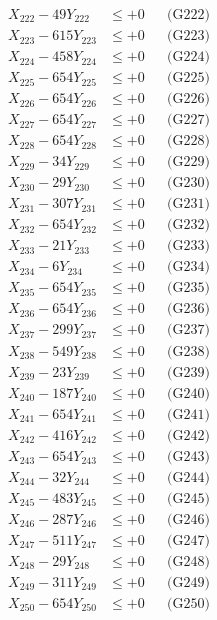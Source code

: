 \documentclass[a4paper,10pt]{article}
\begin{document}
{\begin{align}
X_{222} - 49Y_{222} &\leq +0 && \text{(G222)} \\
X_{223} - 615Y_{223} &\leq +0 && \text{(G223)} \\
X_{224} - 458Y_{224} &\leq +0 && \text{(G224)} \\
X_{225} - 654Y_{225} &\leq +0 && \text{(G225)} \\
X_{226} - 654Y_{226} &\leq +0 && \text{(G226)} \\
X_{227} - 654Y_{227} &\leq +0 && \text{(G227)} \\
X_{228} - 654Y_{228} &\leq +0 && \text{(G228)} \\
X_{229} - 34Y_{229} &\leq +0 && \text{(G229)} \\
X_{230} - 29Y_{230} &\leq +0 && \text{(G230)} \\
\allowbreak
X_{231} - 307Y_{231} &\leq +0 && \text{(G231)} \\
X_{232} - 654Y_{232} &\leq +0 && \text{(G232)} \\
X_{233} - 21Y_{233} &\leq +0 && \text{(G233)} \\
X_{234} - 6Y_{234} &\leq +0 && \text{(G234)} \\
X_{235} - 654Y_{235} &\leq +0 && \text{(G235)} \\
X_{236} - 654Y_{236} &\leq +0 && \text{(G236)} \\
X_{237} - 299Y_{237} &\leq +0 && \text{(G237)} \\
X_{238} - 549Y_{238} &\leq +0 && \text{(G238)} \\
X_{239} - 23Y_{239} &\leq +0 && \text{(G239)} \\
X_{240} - 187Y_{240} &\leq +0 && \text{(G240)} \\
\allowbreak
X_{241} - 654Y_{241} &\leq +0 && \text{(G241)} \\
X_{242} - 416Y_{242} &\leq +0 && \text{(G242)} \\
X_{243} - 654Y_{243} &\leq +0 && \text{(G243)} \\
X_{244} - 32Y_{244} &\leq +0 && \text{(G244)} \\
X_{245} - 483Y_{245} &\leq +0 && \text{(G245)} \\
X_{246} - 287Y_{246} &\leq +0 && \text{(G246)} \\
X_{247} - 511Y_{247} &\leq +0 && \text{(G247)} \\
X_{248} - 29Y_{248} &\leq +0 && \text{(G248)} \\
X_{249} - 311Y_{249} &\leq +0 && \text{(G249)} \\
X_{250} - 654Y_{250} &\leq +0 && \text{(G250)} \\

\end{align}}
\end{document}
